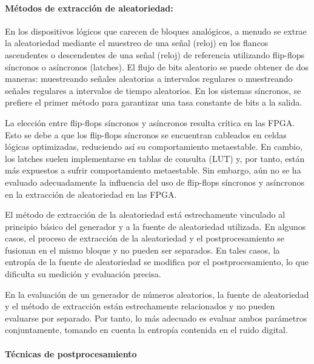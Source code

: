 	            \paragraph{Métodos de extracción de aleatoriedad:\\}	
	
                En los dispositivos lógicos que carecen de bloques analógicos, a menudo se extrae la aleatoriedad mediante el muestreo de una señal (reloj) en los flancos ascendentes o descendentes de una señal (reloj) de referencia utilizando flip-flops síncronos o asíncronos (latches). El flujo de bits aleatorio se puede obtener de dos maneras: muestreando señales aleatorias a intervalos regulares o muestreando señales regulares a intervalos de tiempo aleatorios. En los sistemas síncronos, se prefiere el primer método para garantizar una tasa constante de bits a la salida.

                La elección entre flip-flops síncronos y asíncronos resulta crítica en las FPGA. Esto se debe a que los flip-flops síncronos se encuentran cableados en celdas lógicas optimizadas, reduciendo así su comportamiento metaestable. En cambio, los latches suelen implementarse en tablas de consulta (LUT) y, por tanto, están más expuestos a sufrir comportamiento metaestable. Sin embargo, aún no se ha evaluado adecuadamente la influencia del uso de flip-flops síncronos y asíncronos en la extracción de aleatoriedad en las FPGA.
					
                El método de extracción de la aleatoriedad está estrechamente vinculado al principio básico del generador y a la fuente de aleatoriedad utilizada. En algunos casos, el proceso de extracción de la aleatoriedad y el postprocesamiento se fusionan en el mismo bloque y no pueden ser separados. En tales casos, la entropía de la fuente de aleatoriedad se modifica por el postprocesamiento, lo que dificulta su medición y evaluación precisa.
					
                En la evaluación de un generador de números aleatorios, la fuente de aleatoriedad y el método de extracción están estrechamente relacionados y no pueden evaluarse por separado. Por tanto, lo más adecuado es evaluar ambos parámetros conjuntamente, tomando en cuenta la entropía contenida en el ruido digital.
		
                \paragraph{Técnicas de postprocesamiento\\}
					
